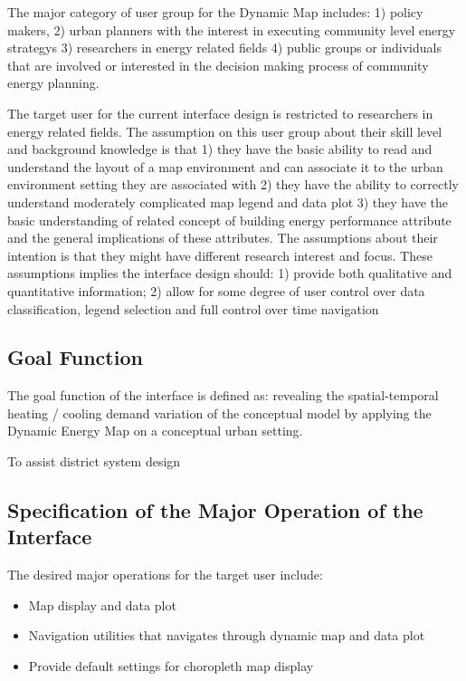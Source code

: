 \documentclass[hidelinks,12pt]{article}
\begin{document}
The major category of user group for the Dynamic Map includes: 1)
policy makers, 2) urban planners with the interest in executing
community level energy strategys 3) researchers in energy related
fields 4) public groups or individuals that are involved or interested
in the decision making process of community energy planning.

The target user for the current interface design is restricted to
researchers in energy related fields. The assumption on this user
group about their skill level and background knowledge is that 1) they
have the basic ability to read and understand the layout of a map
environment and can associate it to the urban environment setting they
are associated with 2) they have the ability to correctly understand
moderately complicated map legend and data plot 3) they have the basic
understanding of related concept of building energy performance
attribute and the general implications of these attributes. The
assumptions about their intention is that they might have different
research interest and focus. These assumptions implies the interface
design should: 1) provide both qualitative and quantitative
information; 2) allow for some degree of user control over data
classification, legend selection and full control over time navigation

\subsection{Goal Function}
The goal function of the interface is defined as: revealing the
spatial-temporal heating / cooling demand variation of the conceptual
model by applying the Dynamic Energy Map on a conceptual urban
setting.

To assist district system design

\subsection{Specification of the Major Operation of the Interface}

The desired major operations for the target user include: 
\begin{itemize}
\item Map display and data plot
\item Navigation utilities that navigates through dynamic map and data
  plot
\item Provide default settings for choropleth map display
\end{itemize}
\end{document}
